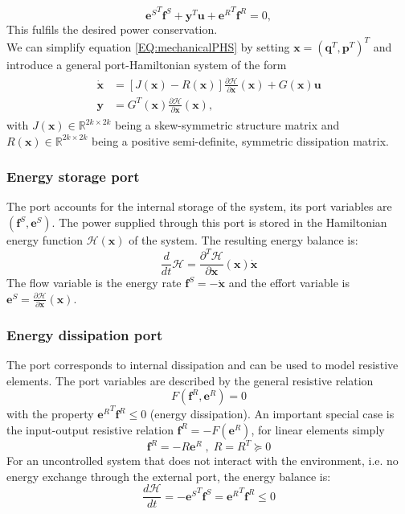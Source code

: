 \documentclass[a4paper,twoside, openright,12pt]{report}
\newcommand{\f}[1]{\boldsymbol{#1}}
\begin{document}
{\begin{equation}
{\f{e}^S}^T\f{f}^S + {\f{y}}^T\f{u} + {\f{e}^R}^T\f{f}^R = 0,
\end{equation}
This fulfils the desired power conservation.\\
We can simplify equation \ref{EQ:mechanicalPHS} by setting $\f{x} = (\f{q}^T,\f{p}^T)^T$ and introduce a general port-Hamiltonian system of the form
\begin{eqnarray}\label{EQ:generalPHS}
\begin{aligned}
\dot{\f{x}} &= [J(\f{x})-R(\f{x})]\frac{\partial \mathcal{H}}{\partial \f{x}}(\f{x}) + G(\f{x})\f{u}\\
\f{y} &= G^T(\f{x})\frac{\partial \mathcal{H}}{\partial \f{x}}(\f{x}),
\end{aligned}
\end{eqnarray}
with $J(\f{x}) \in \mathbb{R}^{2k \times 2k}$ being a skew-symmetric structure matrix and $R(\f{x})  \in  \mathbb{R}^{2k \times 2k}$ being a positive semi-definite, symmetric dissipation matrix.

\subsubsection{Energy storage port}
The port accounts for the internal storage of the system, its port variables are $ (\f{f}^S,\f{e}^S) $. The power supplied through this port is stored in the Hamiltonian energy function $\mathcal{H}(\f{x})$ of the system. The resulting energy balance is:
\begin{equation}\label{EQ:storageport}
	\frac{d}{dt}\mathcal{H} = \frac{\partial^T \mathcal{H}}{\partial \f{x}}(\f{x}) \dot{\f{x}}
\end{equation}
The flow variable is the energy rate $ \f{f}^S = -\dot{\f{x}} $ and the effort variable is $ \f{e}^S = \frac{\partial \mathcal{H}}{\partial \f{x}}(\f{x}) $.

\subsubsection{Energy dissipation port}
The port corresponds to internal dissipation and can be used to model resistive elements. The port variables are described by the general resistive relation
\begin{equation}
	F(\f{f}^R,\f{e}^R)=0
\end{equation}
with the property  $ {\f{e}^R}^T  \f{f}^R \leq 0 $ (energy dissipation). An important special case is the input-output resistive relation $\f{f}^R = -F(\f{e}^R)$, for linear elements simply
\begin{equation}
\f{f}^R = -R\f{e}^R \; , \; R=R^T \succeq 0
\end{equation}
For an uncontrolled system that does not interact with the environment, i.e. no energy exchange through the  external port, the energy balance is:
\begin{equation}
	\frac{d\mathcal{H}}{dt} = -{\f{e}^S}^T \f{f}^S = {\f{e}^R}^T \f{f}^R \leq 0
\end{equation}

}
\end{document}
